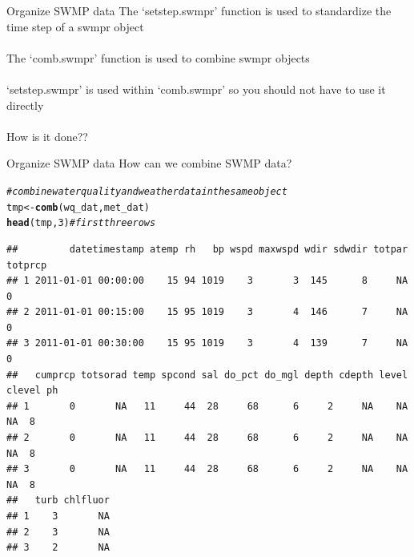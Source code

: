 \documentclass[xcolor=svgnames]{beamer}\usepackage[]{graphicx}\usepackage[]{color}
\makeatletter
\newcommand{\hlnum}[1]{\textcolor[rgb]{0.686,0.059,0.569}{#1}}%
\newcommand{\hlcom}[1]{\textcolor[rgb]{0.678,0.584,0.686}{\textit{#1}}}%
\newcommand{\hlstd}[1]{\textcolor[rgb]{0.345,0.345,0.345}{#1}}%
\newcommand{\hlkwb}[1]{\textcolor[rgb]{0.69,0.353,0.396}{#1}}%
\newcommand{\hlkwd}[1]{\textcolor[rgb]{0.737,0.353,0.396}{\textbf{#1}}}%
\newenvironment{kframe}{%
 \def\at@end@of@kframe{}%
 \ifinner\ifhmode%
  \def\at@end@of@kframe{\end{minipage}}%
  \begin{minipage}{\columnwidth}%
 \fi\fi%
 \def\FrameCommand##1{\hskip\@totalleftmargin \hskip-\fboxsep
 \colorbox{shadecolor}{##1}\hskip-\fboxsep
     \hskip-\linewidth \hskip-\@totalleftmargin \hskip\columnwidth}%
 \MakeFramed {\advance\hsize-\width
   \@totalleftmargin\z@ \linewidth\hsize
   \@setminipage}}%
 {\par\unskip\endMakeFramed%
 \at@end@of@kframe}
\newenvironment{knitrout}{}{} %
\makeatother
\begin{document}
\begin{frame}[containsverbatim]{Organize SWMP data}
The `setstep.swmpr' function is used to standardize the time step of a swmpr object \\~\\
The `comb.swmpr' function is used to combine swmpr objects \\~\\
`setstep.swmpr' is used within `comb.swmpr' so you should not have to use it directly \\~\\
How is it done??
\end{frame}

\begin{frame}[containsverbatim]{Organize SWMP data}
How can we combine SWMP data?
\begin{knitrout}\scriptsize
{}\color{fgcolor}\begin{kframe}
\begin{alltt}
\hlcom{# combine water quality and weather data in the same object}
\hlstd{tmp} \hlkwb{<-} \hlkwd{comb}\hlstd{(wq_dat, met_dat)}
\hlkwd{head}\hlstd{(tmp,} \hlnum{3}\hlstd{)} \hlcom{# first three rows}
\end{alltt}
\begin{verbatim}
##         datetimestamp atemp rh   bp wspd maxwspd wdir sdwdir totpar totprcp
## 1 2011-01-01 00:00:00    15 94 1019    3       3  145      8     NA       0
## 2 2011-01-01 00:15:00    15 95 1019    3       4  146      7     NA       0
## 3 2011-01-01 00:30:00    15 95 1019    3       4  139      7     NA       0
##   cumprcp totsorad temp spcond sal do_pct do_mgl depth cdepth level clevel ph
## 1       0       NA   11     44  28     68      6     2     NA    NA     NA  8
## 2       0       NA   11     44  28     68      6     2     NA    NA     NA  8
## 3       0       NA   11     44  28     68      6     2     NA    NA     NA  8
##   turb chlfluor
## 1    3       NA
## 2    3       NA
## 3    2       NA
\end{verbatim}
\end{kframe}
\end{knitrout}
\end{frame}
\end{document}
